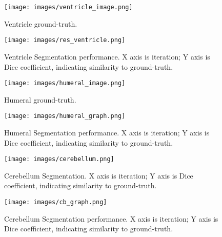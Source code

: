 \clearpage
\begin{figure}[t]
\centering
  \texttt{[image: images/ventricle\_image.png]}
  \caption[Ventricle Ground-Truth]{
  Ventricle ground-truth.
  }\label{fig:ventricleGT}
\end{figure}
\begin{figure}[b]
\centering
  \texttt{[image: images/res\_ventricle.png]}
  \caption[Ventricle Segmentation Performance]{
  Ventricle Segmentation performance.
  X axis is iteration; Y axis is Dice coefficient, indicating similarity to ground-truth.
  }\label{fig:ventriclePerf}
\end{figure}

\clearpage
\begin{figure}[t]
\centering
  \texttt{[image: images/humeral\_image.png]}
  \caption[Humeral Ground-Truth]{
  Humeral ground-truth.
  }\label{fig:humeralGT}
\end{figure}
\begin{figure}[b]
\centering
  \texttt{[image: images/humeral\_graph.png]}
  \caption[Humeral Segmentation Performance]{
  Humeral Segmentation performance.
  X axis is iteration; Y axis is Dice coefficient, indicating similarity to ground-truth.
  }\label{fig:humeralPerf}
\end{figure}

\clearpage
\begin{figure}[t]
\centering
  \texttt{[image: images/cerebellum.png]}
  \caption[Cerebellum Segmentation Ground-Truth]{
  Cerebellum Segmentation.
  X axis is iteration; Y axis is Dice coefficient, indicating similarity to ground-truth.
  }\label{fig:cerebellumGT}
\end{figure}
\begin{figure}[b]
\centering
  \texttt{[image: images/cb\_graph.png]}
  \caption[Cerebellum Segmentation Performance]{
  Cerebellum Segmentation performance.
  X axis is iteration; Y axis is Dice coefficient, indicating similarity to ground-truth.
  }\label{fig:cerebellumPerf}
\end{figure}
\clearpage